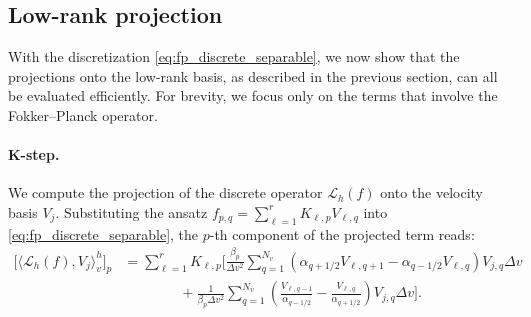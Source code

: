 \documentclass[]{article}
\numberwithin{equation}{section}
\newtheorem{remark}[theorem]{Remark}
\begin{document}

\subsection{Low-rank projection}
\label{sec:fp_projection}

With the discretization \eqref{eq:fp_discrete_separable}, we now show that the projections onto the low-rank basis, as described in the previous section, can all be evaluated efficiently. For brevity, we focus only on the terms that involve the Fokker--Planck operator.

\paragraph{K-step.}
We compute the projection of the discrete operator $\mathcal{L}_h(f)$ onto the velocity basis $V_j$. Substituting the ansatz $f_{p,q} = \sum_{\ell=1}^r K_{\ell,p} V_{\ell,q}$ into \eqref{eq:fp_discrete_separable}, the $p$-th component of the projected term reads:
\begin{equation}
\begin{aligned}
      \Big[\langle \mathcal{L}_{h}(f), V_j \rangle_v^h\Big]_p 
      &= \sum_{\ell=1}^r K_{\ell,p} \Bigg[ 
      \frac{\beta_p}{\Delta v^2} \sum_{q=1}^{N_v} \left( \alpha_{q+1/2} V_{\ell,q+1} - \alpha_{q-1/2} V_{\ell,q} \right)V_{j,q} \Delta v \\
      &\qquad \qquad + \frac{1}{\beta_p \Delta v^2} \sum_{q=1}^{N_v} \left( \frac{V_{\ell,q-1}}{\alpha_{q-1/2}} - \frac{V_{\ell,q}}{\alpha_{q+1/2}} \right)V_{j,q} \Delta v
      \Bigg].
\end{aligned}
\end{equation}
\end{document}
